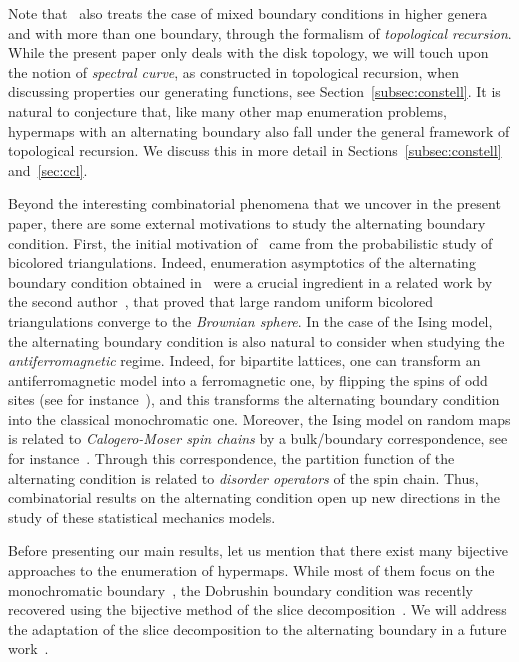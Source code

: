\documentclass{scrartcl}
\begin{document}
Note that~\cite{eyn_2005,eyn_2008,eynard} also treats the case of mixed boundary conditions in higher genera and with more than one boundary, through the formalism of \emph{topological recursion}. While the present paper only deals with the disk topology, we will touch upon the notion of \emph{spectral curve}, as constructed in topological recursion, when discussing properties our generating functions, see Section~\ref{subsec:constell}. It is natural to conjecture that, like many other map enumeration problems, hypermaps with an alternating boundary also fall under the general framework of topological recursion. We discuss this in more detail in Sections~\ref{subsec:constell} and~\ref{sec:ccl}.

Beyond the interesting combinatorial phenomena that we uncover in the present paper, there are some external motivations to study the alternating boundary condition. First, the initial motivation of~\cite{bouttier-carrance} came from the probabilistic study of bicolored triangulations. Indeed, enumeration asymptotics of the alternating boundary condition obtained in~\cite{bouttier-carrance} were a crucial ingredient in a related work by the second author~\cite{carrance-trig-eul}, that proved that large random uniform bicolored triangulations converge to the \emph{Brownian sphere}. In the case of the Ising model, the alternating boundary condition is also natural to consider when studying the \emph{antiferromagnetic} regime. Indeed, for bipartite lattices, one can transform an antiferromagnetic model into a ferromagnetic one, by flipping the spins of odd sites (see for instance~\cite[Section 3.10.5]{friedli-velenik-book}), and this transforms the alternating boundary condition into the classical monochromatic one. Moreover, the Ising model on random maps is related to \emph{Calogero-Moser spin chains} by a bulk/boundary correspondence, see for instance~\cite[Section 6.1]{ekr}. Through this correspondence, the partition function of the alternating condition is related to \emph{disorder operators} of the spin chain. Thus, combinatorial results on the alternating condition open up new directions in the study of these statistical mechanics models.


Before presenting our main results, let us mention that there exist many bijective approaches to the enumeration of hypermaps. While most of them focus on the monochromatic boundary~\cite{bm-s-ising, bdg, bdg-hard-particles, bouttier-fusy-guitter, bernardi-fusy, albenque-menard-tokka}, the Dobrushin boundary condition was recently recovered using the bijective method of the slice decomposition~\cite{albenque-bouttier-slices}. We will address the adaptation of the slice decomposition to the alternating boundary in a future work~\cite{slices-alt}.
\end{document}
